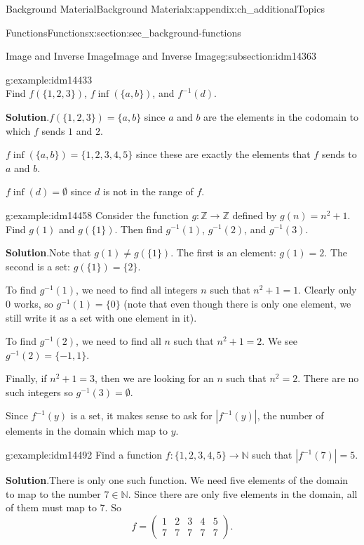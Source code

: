 \documentclass[oneside,10pt,]{book}
\numberwithin{equation}{chapter}
\def\N{\mathbb N}
\def\Z{\mathbb Z}
\def\inv{^{-1}}
\newcommand{\card}[1]{\left| #1 \right|}
\newcommand{\amp}{&}
\begin{document}
\begin{appendixptx}{Background Material}{}{Background Material}{}{}{x:appendix:ch_additionalTopics}
\begin{sectionptx}{Functions}{}{Functions}{}{}{x:section:sec_background-functions}
\begin{subsectionptx}{Image and Inverse Image}{}{Image and Inverse Image}{}{}{g:subsection:idm14363}
\begin{example}{}{g:example:idm14433}
\begin{equation*}
\end{equation*}
Find \(f(\{1,2,3\})\),  \(f\inf(\{a,b\})\), and \(f\inv(d)\).%
\par\smallskip%
\noindent\textbf{Solution}.\hypertarget{g:solution:idm14441}{}\quad{}\(f(\{1,2,3\}) = \{a,b\}\) since \(a\) and \(b\) are the elements in the codomain to which \(f\) sends \(1\) and \(2\).%
\par
\(f\inf(\{a,b\}) = \{1,2,3,4,5\}\) since these are exactly the elements that \(f\) sends to \(a\) and \(b\).%
\par
\(f\inf(d) = \emptyset\) since \(d\) is not in the range of \(f\).%
\end{example}
\begin{example}{}{g:example:idm14458}%
Consider the function \(g:\Z \to \Z\) defined by \(g(n) = n^2 + 1\). Find \(g(1)\) and \(g(\{1\})\).  Then find \(g\inv(1)\), \(g\inv(2)\), and \(g\inv(3)\).%
\par\smallskip%
\noindent\textbf{Solution}.\hypertarget{g:solution:idm14468}{}\quad{}Note that \(g(1) \ne g(\{1\})\).  The first is an element: \(g(1) = 2\).  The second is a set: \(g(\{1\}) = \{2\}\).%
\par
To find \(g\inv(1)\), we need to find all integers \(n\) such that \(n^2 + 1 = 1\). Clearly only 0 works, so \(g\inv(1) = \{0\}\) (note that even though there is only one element, we still write it as a set with one element in it).%
\par
To find \(g\inv(2)\), we need to find all \(n\) such that \(n^2 + 1 = 2\). We see \(g\inv(2) = \{-1,1\}\).%
\par
Finally, if \(n^2 + 1 = 3\), then we are looking for an \(n\) such that \(n^2 = 2\). There are no such integers so \(g\inv(3) = \emptyset\).%
\end{example}
Since \(f\inv(y)\) is a set, it makes sense to ask for \(\card{f\inv(y)}\), the number of elements in the domain which map to \(y\).%
\begin{example}{}{g:example:idm14492}%
Find a function \(f:\{1,2,3,4,5\} \to \N\) such that \(\card{f\inv(7)} = 5\).%
\par\smallskip%
\noindent\textbf{Solution}.\hypertarget{g:solution:idm14497}{}\quad{}There is only one such function. We need five elements of the domain to map to the number \(7 \in \N\). Since there are only five elements in the domain, all of them must map to 7. So%
\begin{equation*}
f = \begin{pmatrix}1 \amp 2 \amp 3 \amp 4 \amp 5 \\ 7 \amp 7 \amp 7 \amp 7 \amp 7\end{pmatrix}.

\end{equation*}
\end{example}
\end{subsectionptx}
\end{sectionptx}
\end{appendixptx}
\end{document}
